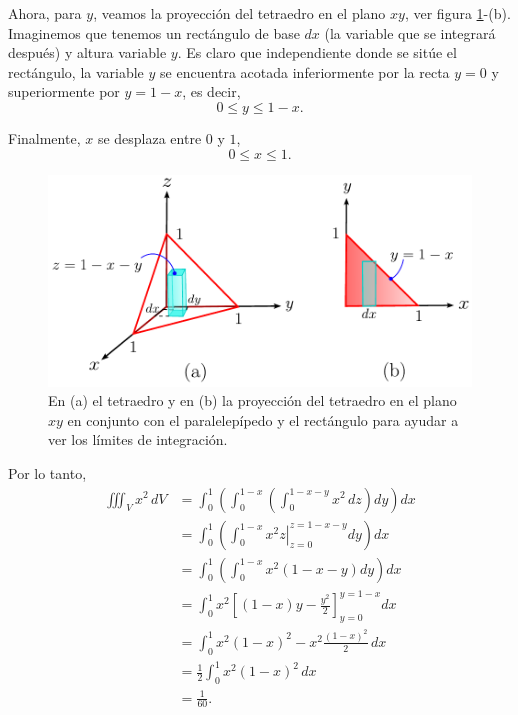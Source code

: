 \begin{ejemplo}
    Ahora, para $y$, veamos la proyección del tetraedro en el plano $xy$, ver figura \ref{fig:Ej-Int_Volumen-2}-(b). Imaginemos que tenemos un rectángulo de base $dx$ (la variable que se integrará después) y altura variable $y$. Es claro que independiente donde se sitúe el rectángulo, la variable $y$ se encuentra acotada inferiormente por la recta $y = 0$ y superiormente por $y = 1 - x$, es decir,
    $$0 \leq y \leq 1-x.$$

    Finalmente, $x$ se desplaza entre $0$ y $1$, 
    $$0 \leq x \leq 1.$$

     \begin{figure}[H]
        \centering
        \includegraphics[scale = 0.7]{Figuras/Ej-Integral-Volumen-2.pdf}
        \caption{En (a) el tetraedro y en (b) la proyección  del tetraedro en el plano $xy$ en conjunto con el paralelepípedo y el rectángulo para ayudar a ver los límites de integración.}
        \label{fig:Ej-Int_Volumen-2}
    \end{figure}

    Por lo tanto,
    \begin{align*}
        \iiint_V x^2 \,dV &= \int_0^1 \left(\int_0^{1-x} \left(\int_0^{1-x-y} x^2 \,dz \right) dy \right) dx \\
        &= \int_0^1 \left(\int_0^{1-x} \left.  x^2 z \right|_{z=0}^{z = 1-x-y} dy \right) dx \\
        &= \int_0^1 \left(\int_0^{1-x} x^2(1-x-y) dy \right) dx \\
        &= \int_0^1 x^2 \left[ (1-x)y - \frac{y^2}{2} \right]_{y = 0}^{y = 1-x} dx  \\
        &= \int_0^1 x^2  (1-x)^2- x^2 \frac{(1-x)^2}{2}  \,dx \\
        &= \frac{1}{2} \int_0^1 x^2(1-x)^2 \,dx \\
        &= \frac{1}{60}.
    \end{align*}


\end{ejemplo}

